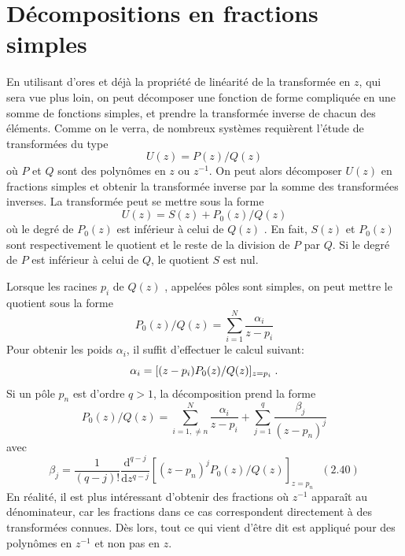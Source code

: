 \section{D\'{e}compositions en fractions simples}
En utilisant d'ores et d\'{e}j\`{a} la propri\'{e}t\'{e} de lin\'{e}arit\'{e} de la transform\'{e}e en $z$, qui sera vue plus loin, on peut d\'{e}composer une fonction de forme compliqu\'{e}e en une somme de fonctions simples, et prendre la transform\'{e}e inverse de chacun des \'{e}l\'{e}ments. Comme on le verra, de nombreux syst\`{e}mes requi\`{e}rent l'\'{e}tude de transform\'{e}es du type
\begin{equation}
\label{eq:definition-U}
U(z)=P(z)/Q(z)
\end{equation}
o\`{u} $P$ et $Q$ sont des polyn\^{o}mes en $z$ ou $z^{-1}$. On peut alors d\'{e}composer $U(z)$ en fractions simples et obtenir la transform\'{e}e inverse par la somme des transform\'{e}es inverses. La transform\'{e}e peut se mettre sous la forme
$$
U(z)=S(z)+P_{0}(z)/Q(z)
$$
o\`{u} le degr\'{e} de $P_{0}(z)$ est inf\'{e}rieur \`{a} celui de $Q(z)$ . En fait, $S(z)$ et $P_{0}(z)$ sont respectivement le quotient et le reste de la division de $P$ par $Q$. Si le degr\'{e} de $P$ est inf\'{e}rieur \`{a} celui de $Q$, le quotient $S$ est nul.

Lorsque les racines $p_{i}$ de $Q(z)$ , appel\'{e}es p\^{o}les sont simples, on peut mettre le quotient sous la forme
\begin{equation}
\label{eq:decomposition-pole-simple}
P_{0}(z)/Q(z)=\sum_{i=1}^{N}\frac{\alpha_{i}}{z-p_{i}}
\end{equation}
Pour obtenir les poids $\alpha_{i}$, il suffit d'effectuer le calcul suivant:
$$
\alpha_{i}=[(z-p_{i})P_{0}(z)/Q(z)]_{z=p_{i}} \;.
$$
Si un p\^{o}le $p_{n}$ est d'ordre $q>1$, la d\'{e}composition prend la forme
$$
P_{0}(z)/Q(z)=\sum_{i=1,\neq n}^{N}\frac{\alpha_{i}}{z-p_{i}}+\sum_{j=1}^{q}\frac{\beta_{j}}{(z-p_{n})^{j}}
$$
avec
$$
\beta_{j}=\frac{1}{(q-j)!}\frac{\mathrm{d}^{q-j}}{\mathrm{d}z^{q-j}}[(z-p_{n})^{j}P_{0}(z)/Q(z)]_{z=p_{n}}\text{   }(2.40)
$$
En r\'{e}alit\'{e}, il est plus int\'{e}ressant d'obtenir des fractions o\`{u} $z^{-1}$ apparaît au
d\'{e}nominateur, car les fractions dans ce cas correspondent directement \`{a} des
transform\'{e}es connues. D\`{e}s lors, tout ce qui vient d'\^{e}tre dit est appliqu\'{e} pour
des polyn\^{o}mes en $z^{-1}$ et non pas en $z$.

